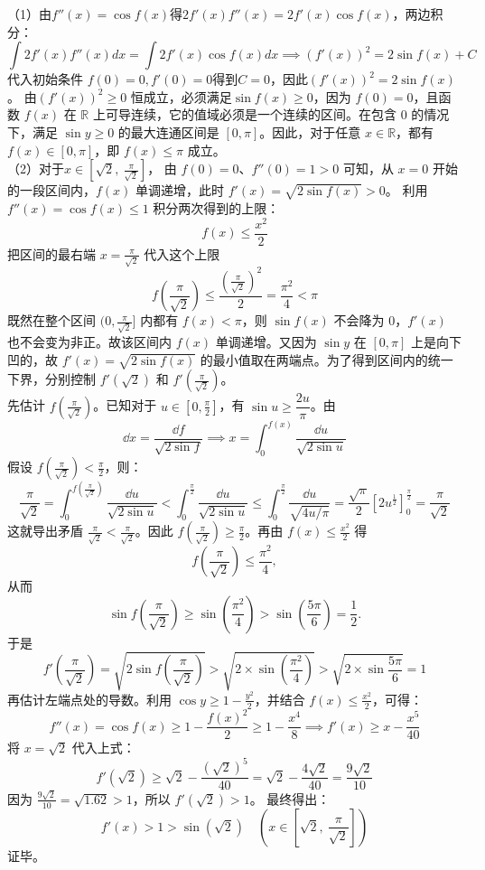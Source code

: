 \begin{solution}
（1）由$f''(x) = \cos f(x)$得$2f'(x)f''(x) = 2f'(x)\cos f(x)$，两边积分：
$$\int 2f'(x)f''(x) dx = \int 2f'(x)\cos f(x) dx\implies(f'(x))^2 = 2\sin f(x) + C$$
代入初始条件 $f(0) = 0, f'(0) = 0$得到$ C = 0$，因此$(f'(x))^2 = 2\sin f(x)$。
由$(f'(x))^2 \geqslant 0$ 恒成立，必须满足$\sin f(x) \geqslant 0$，因为 $f(0) = 0$，且函数 $f(x)$ 在 $\mathbb{R}$ 上可导连续，它的值域必须是一个连续的区间。在包含 0 的情况下，满足 $\sin y \geqslant 0$ 的最大连通区间是 $[0, \pi]$。因此，对于任意 $x \in \mathbb{R}$，都有 $f(x) \in [0, \pi]$，即 $f(x) \leqslant \pi$ 成立。\\
（2）对于$x \in \left[\sqrt{2},\ \frac{\pi}{\sqrt{2}}\right]$，
由 $f(0) = 0$、$f''(0) = 1 > 0$ 可知，从 $x=0$ 开始的一段区间内，$f(x)$ 单调递增，此时 $f'(x) = \sqrt{2\sin f(x)}>0$。
利用 $f''(x) = \cos f(x) \leqslant 1$ 积分两次得到的上限：$$f(x) \leqslant \frac{x^2}{2}$$
把区间的最右端 $x = \frac{\pi}{\sqrt{2}}$ 代入这个上限
$$f\left(\frac{\pi}{\sqrt{2}}\right) \leqslant \frac{\left(\frac{\pi}{\sqrt{2}}\right)^2}{2} = \frac{\pi^2}{4}<\pi$$
既然在整个区间 $(0, \frac{\pi}{\sqrt{2}}]$ 内都有 $f(x) < \pi$，则 $\sin f(x)$ 不会降为 $0$，$f'(x)$ 也不会变为非正。故该区间内 $f(x)$ 单调递增。又因为 $\sin y$ 在 $[0, \pi]$ 上是向下凹的，故 $f'(x) = \sqrt{2\sin f(x)}$ 的最小值取在两端点。为了得到区间内的统一下界，分别控制 $f'(\sqrt{2})$ 和 $f'\left(\frac{\pi}{\sqrt{2}}\right)$。\\
先估计 $f\left(\frac{\pi}{\sqrt{2}}\right)$。已知对于 $u \in \left[0, \frac{\pi}{2}\right]$，有 $\sin u \geqslant \dfrac{2u}{\pi}$。由
\[\dd x = \dfrac{\dd f}{\sqrt{2\sin f}}\implies x = \int_0^{f(x)} \frac{\dd u}{\sqrt{2\sin u}}\]
假设 $f\left(\frac{\pi}{\sqrt{2}}\right) < \frac{\pi}{2}$，则：
$$\frac{\pi}{\sqrt{2}} = \int_0^{f(\frac{\pi}{\sqrt{2}})} \frac{\dd u}{\sqrt{2\sin u}} < \int_0^{\frac{\pi}{2}} \frac{\dd u}{\sqrt{2\sin u}} \leqslant \int_0^{\frac{\pi}{2}} \frac{\dd u}{\sqrt{4u/\pi}} = \frac{\sqrt{\pi}}{2} \left[ 2u^{\frac{1}{2}} \right]_0^{\frac{\pi}{2}} = \frac{\pi}{\sqrt{2}}$$
这就导出矛盾 $\frac{\pi}{\sqrt{2}} < \frac{\pi}{\sqrt{2}}$。因此 $f\left(\frac{\pi}{\sqrt{2}}\right) \geqslant \frac{\pi}{2}$。再由 $f(x) \leqslant \frac{x^2}{2}$ 得
\[
f\left(\frac{\pi}{\sqrt{2}}\right) \leqslant \frac{\pi^2}{4},
\]
从而
\[
\sin f\left(\frac{\pi}{\sqrt{2}}\right) \geqslant \sin\left(\frac{\pi^2}{4}\right) > \sin\left(\frac{5\pi}{6}\right) = \frac{1}{2}.
\]
于是
$$f'\left(\frac{\pi}{\sqrt{2}}\right) = \sqrt{2\sin f\left(\frac{\pi}{\sqrt{2}}\right)} > \sqrt{2 \times\sin\left(\frac{\pi^2}{4}\right)}>\sqrt{2 \times\sin\frac{5\pi}{6}} = 1$$
再估计左端点处的导数。利用 $\cos y \geqslant 1 - \frac{y^2}{2}$，并结合 $f(x) \leqslant \frac{x^2}{2}$，可得：
$$f''(x) = \cos f(x) \geqslant 1 - \frac{f(x)^2}{2} \geqslant 1 - \frac{x^4}{8}\implies f'(x) \geqslant x - \frac{x^5}{40}$$
将 $x = \sqrt{2}$ 代入上式：$$f'(\sqrt{2}) \geqslant \sqrt{2} - \frac{(\sqrt{2})^5}{40} = \sqrt{2} - \frac{4\sqrt{2}}{40} = \frac{9\sqrt{2}}{10}$$因为 $\frac{9\sqrt{2}}{10} = \sqrt{1.62} > 1$，所以 $f'(\sqrt{2}) > 1$。
最终得出：$$f'(x) > 1 > \sin(\sqrt{2}) \quad \left(x \in \left[\sqrt{2},\ \frac{\pi}{\sqrt{2}}\right]\right)$$证毕。
\end{solution}



